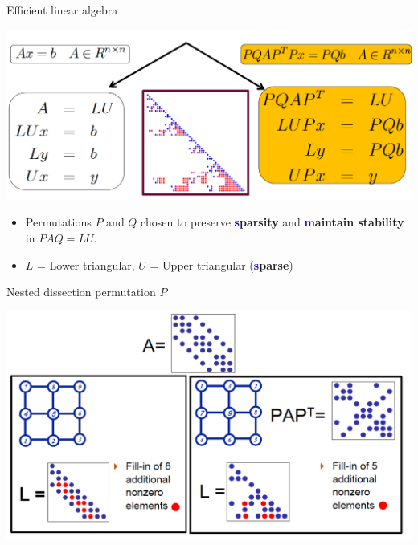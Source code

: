 \documentclass[handout]{beamer}
{
\usepackage{fullpage}
\usepackage{hyperref}
\usepackage{amssymb} 
}
\newcommand{\blue}[1]{\textcolor{blue}{#1}}
\begin{document}
\begin{frame}{Efficient linear algebra}
   \begin{center}
\includegraphics[width=0.90\linewidth]{figures/lu.png}
    \end{center}

\begin{itemize}
\item Permutations $P$ and $Q$ chosen to preserve 
\textbf{\blue sparsity} and \textbf{\blue maintain stability} in $P A Q = LU$.
\item $L$ =  Lower triangular, $U$ = Upper triangular (\textbf{\blue sparse})

\end{itemize}
\end{frame}




\begin{frame}{Nested dissection permutation $P$} 
  \begin{center}
\includegraphics[width=0.95\linewidth]{figures/mrtis2.png}
    \end{center}
\end{frame}
\end{document}
